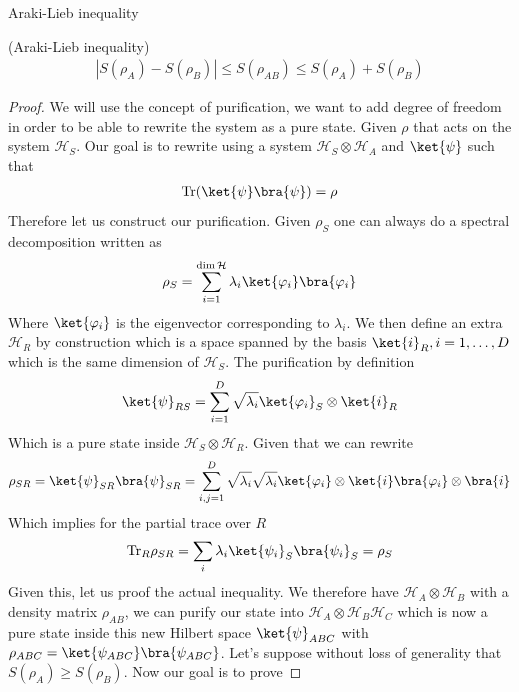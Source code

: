 \begin{parag}{Araki-Lieb inequality}
	\begin{theoreme}{(Araki-Lieb inequality)}
    \begin{align*} 
    	\left|S\left(\rho_A\right) - S\left(\rho_B\right)\right| \leq S\left(\rho_{AB}\right)  \leq S\left(\rho_A\right) + S\left(\rho_B\right)
    \end{align*}
    \end{theoreme}
	\begin{proof}
	    We will use the concept of purification, we want to add degree of freedom in order to be able to rewrite the system as a pure state. Given $\rho$ that acts on the system $\mathcal{H}_S$. Our goal is to rewrite using a system $\mathcal{H}_S \otimes \mathcal{H}_A$ and $\ket{\psi}$ such that 
		\begin{align*} 
			\text{Tr}\left(\ket{\psi}\bra{\psi}\right)  = \rho
		\end{align*}
	Therefore let us construct our purification. Given $\rho_S$ one can always do a spectral decomposition written as 
	\begin{align*} 
		\rho_S =  \sum_{i= 1}^{\dim \mathcal{H}} \lambda_i \ket{\phi_i}\bra{\phi_i}
	\end{align*}
	Where $\ket{\phi_i}$ is the eigenvector corresponding to $\lambda_i$. We then define an extra $\mathcal{H}_R$ by construction which is a space spanned by the basis $\ket{i}_R, i = 1, \ldots, D$ which is the same dimension of $\mathcal{H}_S$. The purification by definition  
	\begin{align*} 
		\ket{\psi}_{RS} = \sum_{i= 1}^{D} \sqrt{\lambda_i} \ket{\phi_i}_S \otimes \ket{i}_R
	\end{align*}
	Which is a pure state inside $\mathcal{H}_S \otimes \mathcal{H}_R$. Given that we can rewrite 
	\begin{align*} 
		\rho_{S R} =  \ket{\psi}_{S R}\bra{\psi}_{S R} = \sum_{i, j = 1}^{D} \sqrt{\lambda_i}\sqrt{\lambda_i} \ket{\phi_i} \otimes \ket{i} \bra{\phi_i} \otimes \bra{i} 
	\end{align*}
	Which implies for the partial trace over $R$  
	\begin{align*} 
		\text{Tr}_{R} \rho_{S R} = \sum_{i} \lambda_i \ket{\psi_i}_S \bra{\psi_i}_S = \rho_S
	\end{align*}
	Given this, let us proof the actual inequality. We therefore have $\mathcal{H}_A \otimes \mathcal{H}_B$ with a density matrix $\rho_{AB}$, we can purify our state into $\mathcal{H}_A \otimes \mathcal{H}_B \mathcal{H}_C$ which is now a pure state inside this new Hilbert space $\ket{\psi}_{ABC}$ with $\rho_{ABC} = \ket{\psi_{ABC}}\bra{\psi_{ABC}}$. Let's suppose without loss of generality that $S\left(\rho_A\right) \geq S\left(\rho_B\right)$. Now our goal is to prove 

\end{proof}
\end{parag}

